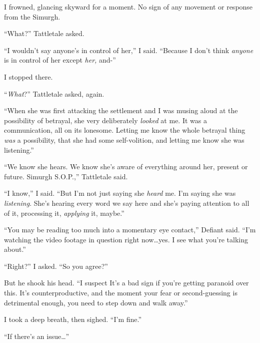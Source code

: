 I frowned, glancing skyward for a moment.  No sign of any movement or response from the Simurgh.



``What?'' Tattletale asked.



``I wouldn't say anyone's in control of her,'' I said.  ``Because I don't think \emph{anyone} is in control of her except \emph{her, }and-''



I stopped there.



``\emph{What}?'' Tattletale asked, again.



``When she was first attacking the settlement and I was musing aloud at the possibility of betrayal, she very deliberately \emph{looked} at me.  It was a communication, all on its lonesome.  Letting me know the whole betrayal thing \emph{was} a possibility, that she had some self-volition, and letting me know she was listening.''



``We know she hears.  We know she's aware of everything around her, present or future.  Simurgh S.O.P.,'' Tattletale said.



``I know,'' I said.  ``But I'm not just saying she \emph{heard} me.  I'm saying she was \emph{listening}.  She's hearing every word we say here and she's paying attention to all of it, processing it, \emph{applying} it, maybe.''



``You may be reading too much into a momentary eye contact,'' Defiant said.  ``I'm watching the video footage in question right now\ldots yes.  I see what you're talking about.''



``Right?'' I asked.  ``So you agree?''



But he shook his head.  ``I suspect It's a bad sign if you're getting paranoid over this.  It's counterproductive, and the moment your fear or second-guessing is detrimental enough, you need to step down and walk away.''



I took a deep breath, then sighed.  ``I'm fine.''



``If there's an issue\ldots''




